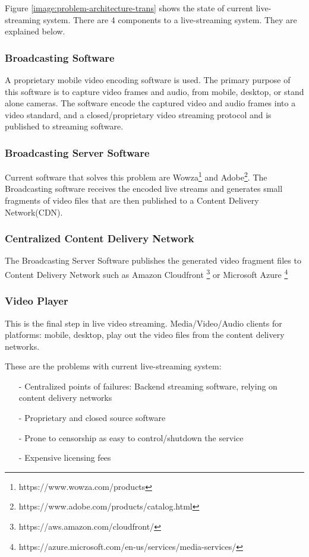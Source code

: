 \documentclass{article}
\begin{document}
Figure \ref{image:problem-architecture-trans} shows the state of current live-streaming system. There are 4 components to a live-streaming system. They are explained below.
\subsubsection{Broadcasting Software}
A proprietary mobile video encoding software is used. The primary purpose of this software is to capture video frames and audio, from mobile, desktop, or stand alone cameras. The software encode the captured video and audio frames into a video standard, and a closed/proprietary video streaming protocol and is published to streaming software.

\subsubsection{Broadcasting Server Software}
Current software that solves this problem are Wowza\footnote{https://www.wowza.com/products} and Adobe\footnote{https://www.adobe.com/products/catalog.html}. The Broadcasting software receives the encoded live streams and generates small fragments of video files that are then published to a Content Delivery Network(CDN).

\subsubsection{Centralized Content Delivery Network}
The Broadcasting Server Software publishes the generated video fragment files to Content Delivery Network such as Amazon Cloudfront \footnote{https://aws.amazon.com/cloudfront/} or Microsoft Azure \footnote{https://azure.microsoft.com/en-us/services/media-services/}

\subsubsection{Video Player}
This is the final step in live video streaming. Media/Video/Audio clients for platforms: mobile, desktop, play out the video files from the content delivery networks.


These are the problems with current live-streaming system:
\begin{itemize}
 \item[-]Centralized points of failures: Backend streaming software, relying on content delivery networks
 \item[-]Proprietary and closed source software
 \item[-]Prone to censorship as easy to control/shutdown the service
 \item[-]Expensive licensing fees
\end{itemize}
\end{document}
